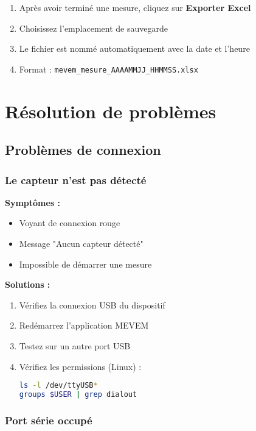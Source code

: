 \documentclass[12pt,a4paper]{article}
\begin{document}
\begin{enumerate}
    \item Après avoir terminé une mesure, cliquez sur \textbf{Exporter Excel}
    \item Choisissez l'emplacement de sauvegarde
    \item Le fichier est nommé automatiquement avec la date et l'heure
    \item Format : \texttt{mevem\_mesure\_AAAAMMJJ\_HHMMSS.xlsx}
\end{enumerate}

\section{Résolution de problèmes}

\subsection{Problèmes de connexion}

\subsubsection{Le capteur n'est pas détecté}

\textbf{Symptômes :}
\begin{itemize}
    \item Voyant de connexion rouge
    \item Message "Aucun capteur détecté"
    \item Impossible de démarrer une mesure
\end{itemize}

\textbf{Solutions :}
\begin{enumerate}
    \item Vérifiez la connexion USB du dispositif
    \item Redémarrez l'application MEVEM
    \item Testez sur un autre port USB
    \item Vérifiez les permissions (Linux) :
    \begin{lstlisting}[language=bash]
ls -l /dev/ttyUSB*
groups $USER | grep dialout
    \end{lstlisting}
\end{enumerate}

\subsubsection{Port série occupé}
\end{document}
